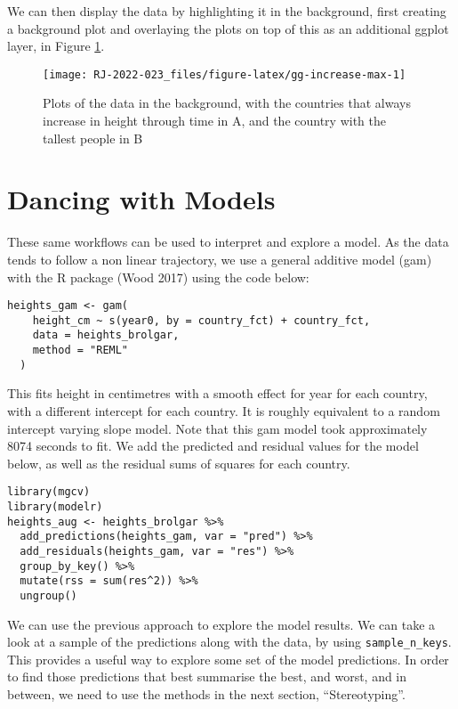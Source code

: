We can then display the data by highlighting it in the background, first creating a background plot and overlaying the plots on top of this as an additional ggplot layer, in Figure
\ref{fig:gg-increase-max}.

\begin{figure}

{\centering \texttt{[image: RJ-2022-023\_files/figure-latex/gg-increase-max-1]} 

}

\caption{Plots of the data in the background, with the countries that always increase in height through time in A, and the country with the tallest people in B}\label{fig:gg-increase-max}
\end{figure}

\hypertarget{dancing-with-models}{%
\section{Dancing with Models}\label{dancing-with-models}}

These same workflows can be used to interpret and explore a model. As the data tends to follow a non linear trajectory, we use a general additive model (gam) with the  R package (Wood 2017) using the code below:

\begin{verbatim}
heights_gam <- gam(
    height_cm ~ s(year0, by = country_fct) + country_fct,
    data = heights_brolgar,
    method = "REML"
  )
\end{verbatim}

This fits height in centimetres with a smooth effect for year for each country, with a different intercept for each country. It is roughly equivalent to a random intercept varying slope model. Note that this gam model took approximately 8074 seconds to fit. We add the predicted and residual values for the model below, as well as the residual sums of squares for each country.

\begin{verbatim}
library(mgcv)
library(modelr)
heights_aug <- heights_brolgar %>%
  add_predictions(heights_gam, var = "pred") %>%
  add_residuals(heights_gam, var = "res") %>% 
  group_by_key() %>% 
  mutate(rss = sum(res^2)) %>% 
  ungroup()
\end{verbatim}

We can use the previous approach to explore the model results. We can take a look at a sample of the predictions along with the data, by using \texttt{sample\_n\_keys}. This provides a useful way to explore some set of the model predictions. In order to find those predictions that best summarise the best, and worst, and in between, we need to use the methods in the next section, ``Stereotyping''.

